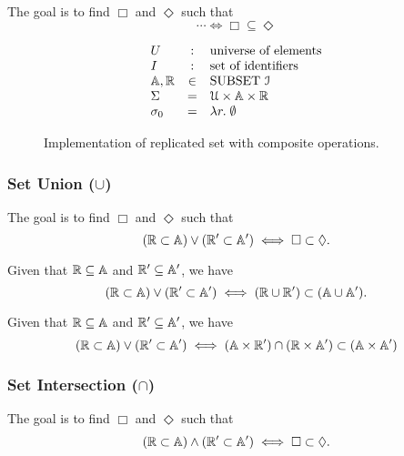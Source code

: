 The goal is to find $\Box$ and $\Diamond$ such that 	
\[
   \cdots \iff \Box \subseteq \Diamond
\]

\begin{figure}[t]
  \[
    \begin{array}{lcl}
      U &:& \text{universe of elements}	\\
      I &:& \text{set of identifiers}	\\
      \mathbb{A}, \mathbb{R}  &\in& \text{SUBSET } \mathcal{I}	\\
      \Sigma &=& \mathcal{U} \times \mathbb{A} \times \mathbb{R} \\
      \sigma_{0} &=& \lambda r.\; \emptyset
    \end{array}
  \]
  \caption{Implementation of replicated set with composite operations.}
  \label{fig:rset-protocol}
\end{figure}
\subsubsection{Set Union ($\cup$)}

The goal is to find $\Box$ and $\Diamond$ such that
\[
  (\mathbb{R} \subset \mathbb{A}) \lor (\mathbb{R}' \subset \mathbb{A}') \iff \Box \subset \Diamond.
\]

\begin{theorem}  \label{thm:union}
  Given that $\mathbb{R} \subseteq \mathbb{A}$ and $\mathbb{R}' \subseteq \mathbb{A}'$, we have
  \[
    (\mathbb{R} \subset \mathbb{A}) \lor (\mathbb{R}' \subset \mathbb{A}') \iff (\mathbb{R} \cup \mathbb{R}') \subset (\mathbb{A} \cup \mathbb{A}').
  \]
\end{theorem}

\begin{theorem}  \label{thm:union-alt}	
  Given that $\mathbb{R} \subseteq \mathbb{A}$ and $\mathbb{R}' \subseteq \mathbb{A}'$, we have
  \[
    (\mathbb{R} \subset \mathbb{A}) \lor (\mathbb{R}' \subset \mathbb{A}') \iff 
    (\mathbb{A} \times \mathbb{R}') \cap (\mathbb{R} \times \mathbb{A}') \subset (\mathbb{A} \times \mathbb{A}')
  \]
\end{theorem}
\subsubsection{Set Intersection ($\cap$)}


The goal is to find $\Box$ and $\Diamond$ such that
\[
  (\mathbb{R} \subset \mathbb{A}) \land (\mathbb{R}' \subset \mathbb{A}') \iff \Box \subset \Diamond.
\]

